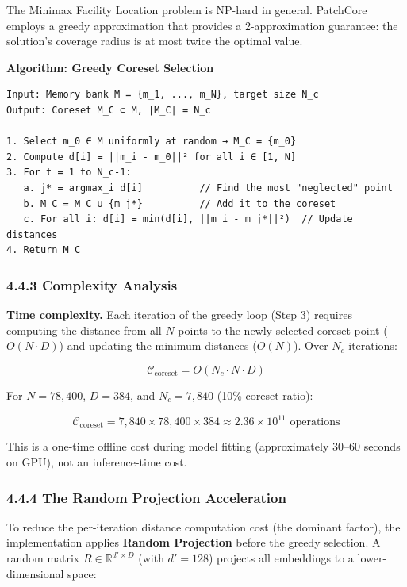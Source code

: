 The Minimax Facility Location problem is NP-hard in general. PatchCore employs a greedy approximation that provides a 2-approximation guarantee: the solution's coverage radius is at most twice the optimal value.

\textbf{Algorithm: Greedy Coreset Selection}

\begin{verbatim}
Input: Memory bank M = {m_1, ..., m_N}, target size N_c
Output: Coreset M_C ⊂ M, |M_C| = N_c

1. Select m_0 ∈ M uniformly at random → M_C = {m_0}
2. Compute d[i] = ||m_i - m_0||² for all i ∈ [1, N]
3. For t = 1 to N_c-1:
   a. j* = argmax_i d[i]          // Find the most "neglected" point
   b. M_C = M_C ∪ {m_j*}          // Add it to the coreset
   c. For all i: d[i] = min(d[i], ||m_i - m_j*||²)  // Update distances
4. Return M_C
\end{verbatim}

\subsubsection{4.4.3 Complexity Analysis}\label{complexity-analysis}

\textbf{Time complexity.} Each iteration of the greedy loop (Step 3) requires computing the distance from all \(N\) points to the newly selected coreset point (\(O(N \cdot D)\)) and updating the minimum distances (\(O(N)\)). Over \(N_c\) iterations:

\[\mathcal{C}_{\text{coreset}} = O(N_c \cdot N \cdot D)\]

For \(N = 78{,}400\), \(D = 384\), and \(N_c = 7{,}840\) (10\% coreset ratio):

\[\mathcal{C}_{\text{coreset}} = 7{,}840 \times 78{,}400 \times 384 \approx 2.36 \times 10^{11} \text{ operations}\]

This is a one-time offline cost during model fitting (approximately 30--60 seconds on GPU), not an inference-time cost.

\subsubsection{4.4.4 The Random Projection Acceleration}\label{the-random-projection-acceleration}

To reduce the per-iteration distance computation cost (the dominant factor), the implementation applies \textbf{Random Projection} before the greedy selection. A random matrix \(R \in \mathbb{R}^{d' \times D}\) (with \(d' = 128\)) projects all embeddings to a lower-dimensional space:

